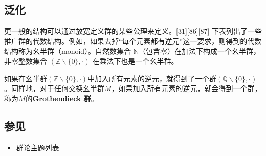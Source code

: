 \subsection{泛化}

更一般的结构可以通过放宽定义群的某些公理来定义。[31][86][87] 下表列出了一些推广群的代数结构。例如，如果去掉“每个元素都有逆元”这一要求，则得到的代数结构称为幺半群（monoid）。自然数集合 \(\mathbb{N}\)（包含零）在加法下构成一个幺半群，非零整数集合 \((\mathbb{Z} \smallsetminus \{0\}, \cdot)\) 在乘法下也是一个幺半群。  

如果在幺半群\((\mathbb{Z} \smallsetminus \{0\}, \cdot)\)中加入所有元素的逆元，就得到了一个群\((\mathbb{Q} \smallsetminus \{0\}, \cdot)\)。同样地，对于任何交换幺半群\(M\)，如果加入所有元素的逆元，就会得到一个群，称为\(M\)的\textbf{Grothendieck 群}。


\subsection{参见}
\begin{itemize}
\item 群论主题列表
\end{itemize}

